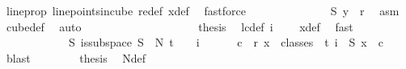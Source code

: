 \begin{isabellebody}
\ line{\isacharunderscore}{\kern0pt}prop\ line{\isacharunderscore}{\kern0pt}points{\isacharunderscore}{\kern0pt}in{\isacharunderscore}{\kern0pt}cube\ redef\ x{\isacharunderscore}{\kern0pt}def\ \isamarkupfalse%
\ fastforce\isanewline
\ \ \ \ \ \ \ \ \ \ \isamarkupfalse%
\ \isamarkupfalse%
\ {\isachardoublequoteopen}{\isasymchi}\ {\isacharparenleft}{\kern0pt}S{}\ y{\isacharparenright}{\kern0pt}\ {\isacharless}{\kern0pt}\ r{\isachardoublequoteclose}\ \isamarkupfalse%
\ asm\ \isamarkupfalse%
\ cube{\isacharunderscore}{\kern0pt}def\ \isamarkupfalse%
\ auto\isanewline
\ \ \ \ \ \ \ \ \isamarkupfalse%
\isanewline
\ \ \ \ \ \ \ \ \isamarkupfalse%
\ \isamarkupfalse%
\ {\isacharquery}{\kern0pt}thesis\ \isamarkupfalse%
\ lc{\isacharunderscore}{\kern0pt}def\ {\isacartoucheopen}i\ {\isacharequal}{\kern0pt}\ {}{\isacartoucheclose}\ \isamarkupfalse%
\ x{\isacharunderscore}{\kern0pt}def\ \isamarkupfalse%
\ fast\isanewline
\ \ \ \ \ \ \isamarkupfalse%
\isanewline
\ \ \ \ \isamarkupfalse%
\isanewline
\ \ \ \ \isamarkupfalse%
\ \isamarkupfalse%
\ {\isachardoublequoteopen}{\isacharparenleft}{\kern0pt}{\isasymexists}S{\isachardot}{\kern0pt}\ is{\isacharunderscore}{\kern0pt}subspace\ S\ {}\ N{\isacharprime}{\kern0pt}\ {\isacharparenleft}{\kern0pt}t\ {\isacharplus}{\kern0pt}\ {}{\isacharparenright}{\kern0pt}\ {\isasymand}\ {\isacharparenleft}{\kern0pt}{\isasymforall}i\ {\isasymin}\ {\isacharbraceleft}{\kern0pt}{\isachardot}{\kern0pt}{\isachardot}{\kern0pt}{}{\isacharbraceright}{\kern0pt}{\isachardot}{\kern0pt}\isanewline
\ \ \ \ {\isasymexists}c\ {\isacharless}{\kern0pt}\ r{\isachardot}{\kern0pt}\ {\isacharparenleft}{\kern0pt}{\isasymforall}x\ {\isasymin}\ classes\ {}\ t\ i{\isachardot}{\kern0pt}\ {\isasymchi}\ {\isacharparenleft}{\kern0pt}S\ x{\isacharparenright}{\kern0pt}\ {\isacharequal}{\kern0pt}\ c{\isacharparenright}{\kern0pt}{\isacharparenright}{\kern0pt}{\isacharparenright}{\kern0pt}{\isachardoublequoteclose}\ \isamarkupfalse%
\ blast\isanewline
\ \ \isamarkupfalse%
\isanewline
\ \ \isamarkupfalse%
\ \isamarkupfalse%
\ {\isacharquery}{\kern0pt}thesis\ \isamarkupfalse%
\ N{\isacharunderscore}{\kern0pt}def\ \isamarkupfalse%

\end{isabellebody}
